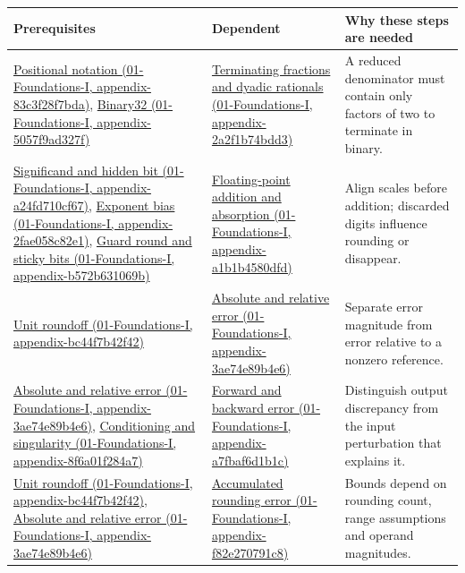 {\def\LTcaptype{none} %
\begin{longtable}[]{@{}
  >{\raggedright\arraybackslash}p{}
  >{\raggedright\arraybackslash}p{}
  >{\raggedright\arraybackslash}p{}@{}}
\toprule\noalign{}
\begin{minipage}[b]{\linewidth}\raggedright
Prerequisites
\end{minipage} & \begin{minipage}[b]{\linewidth}\raggedright
Dependent
\end{minipage} & \begin{minipage}[b]{\linewidth}\raggedright
Why these steps are needed
\end{minipage} \\
\midrule\noalign{}
\endhead
\bottomrule\noalign{}
\endlastfoot
\href{}{Positional notation (01-Foundations-I, appendix-83c3f28f7bda)}, \href{}{Binary32 (01-Foundations-I, appendix-5057f9ad327f)} & \href{}{Terminating fractions and dyadic rationals (01-Foundations-I, appendix-2a2f1b74bdd3)} & A reduced denominator must contain only factors of two to terminate in binary. \\
\href{}{Significand and hidden bit (01-Foundations-I, appendix-a24fd710cf67)}, \href{}{Exponent bias (01-Foundations-I, appendix-2fae058c82e1)}, \href{}{Guard round and sticky bits (01-Foundations-I, appendix-b572b631069b)} & \href{}{Floating-point addition and absorption (01-Foundations-I, appendix-a1b1b4580dfd)} & Align scales before addition; discarded digits influence rounding or disappear. \\
\href{}{Unit roundoff (01-Foundations-I, appendix-bc44f7b42f42)} & \href{}{Absolute and relative error (01-Foundations-I, appendix-3ae74e89b4e6)} & Separate error magnitude from error relative to a nonzero reference. \\
\href{}{Absolute and relative error (01-Foundations-I, appendix-3ae74e89b4e6)}, \href{}{Conditioning and singularity (01-Foundations-I, appendix-8f6a01f284a7)} & \href{}{Forward and backward error (01-Foundations-I, appendix-a7fbaf6d1b1c)} & Distinguish output discrepancy from the input perturbation that explains it. \\
\href{}{Unit roundoff (01-Foundations-I, appendix-bc44f7b42f42)}, \href{}{Absolute and relative error (01-Foundations-I, appendix-3ae74e89b4e6)} & \href{}{Accumulated rounding error (01-Foundations-I, appendix-f82e270791c8)} & Bounds depend on rounding count, range assumptions and operand magnitudes. \\

\end{longtable}}

